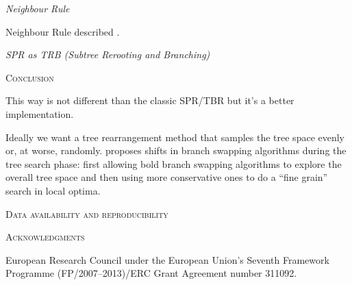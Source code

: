 \documentclass[12pt,letterpaper]{article}
\renewcommand{\section}[1]{%
\bigskip
\begin{center}
\begin{Large}
\normalfont\scshape #1
\medskip
\end{Large}
\end{center}}
\renewcommand{\subsection}[1]{%
\bigskip
\begin{center}
\begin{large}
\normalfont\itshape #1
\end{large}
\end{center}}
\begin{document}

\subsection{Neighbour Rule}
Neighbour Rule described \citep[in other words;][]{allen2001subtree}.

\subsection{SPR as TRB (Subtree Rerooting and Branching)}

\section{Conclusion}

This way is not different than the classic SPR/TBR but it's a better implementation.

Ideally we want a tree rearrangement method that samples the tree space evenly or, at worse, randomly.
\cite{lakner2008efficiency} proposes shifts in branch swapping algorithms during the tree search phase: first allowing bold branch swapping algorithms to explore the overall tree space and then using more conservative ones to do a ``fine grain'' search in local optima.


\section{Data availability and reproducibility}


\section{Acknowledgments}
European Research Council under the European Union’s Seventh Framework Programme (FP/2007–2013)/ERC Grant Agreement number 311092.




\end{document}
